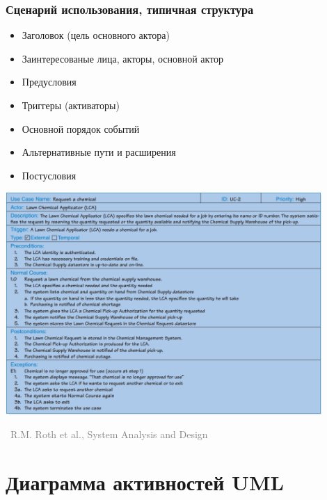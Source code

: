 \documentclass[xetex,mathserif,serif]{beamer}
\newcommand{\attribution}[1] {
    \vspace{-5mm}\begin{flushright}\begin{scriptsize}\textcolor{gray}{\textcopyright\, #1}\end{scriptsize}\end{flushright}
}
\begin{document}
    \begin{frame}
        \frametitle{Сценарий использования, типичная структура}
        \begin{itemize}
            \item Заголовок (цель основного актора)
            \item Заинтересованые лица, акторы, основной актор
            \item Предусловия
            \item Триггеры (активаторы)
            \item Основной порядок событий
            \item Альтернативные пути и расширения
            \item Постусловия
        \end{itemize}
    \end{frame}

    \begin{frame}
        \begin{center}
            \includegraphics[width=0.9\textwidth]{useCaseExample.png}
            \attribution{R.M. Roth et al., System Analysis and Design}
        \end{center}
    \end{frame}

    \section{Диаграмма активностей UML}
\end{document}
